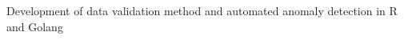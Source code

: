 \begin{cventries}
{\begin{cvitems}
        \item {Development of data validation method and automated anomaly detection in R and Golang}
      \end{cvitems}
    }

\end{cventries}

